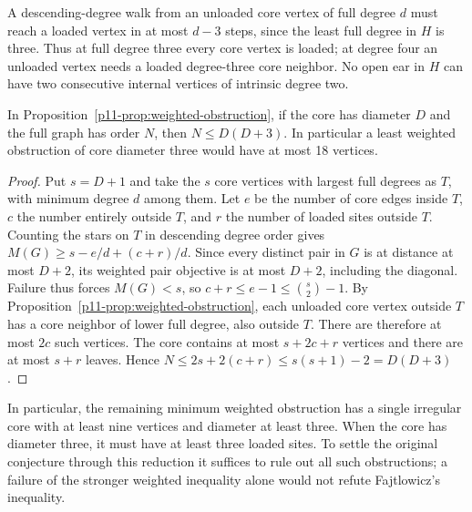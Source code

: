 \documentclass[11pt,a4paper]{article}
\begin{document}
A descending-degree walk from an unloaded core vertex of full degree
$d$ must reach a loaded vertex in at most $d-3$ steps, since the least
full degree in $H$ is three. Thus at full degree three every core
vertex is loaded; at degree four an unloaded vertex needs a loaded
degree-three core neighbor. No open ear in $H$ can have two consecutive
internal vertices of intrinsic degree two.

\begin{corollary}\label{p11-cor:weighted-order}
In Proposition~\ref{p11-prop:weighted-obstruction}, if the core has diameter
$D$ and the full graph has order $N$, then $N\le D(D+3)$.
In particular a least weighted obstruction of core diameter three
would have at most 18 vertices.
\end{corollary}
\begin{proof}
Put $s=D+1$ and take the $s$ core vertices with largest full degrees
as $T$, with minimum degree $d$ among them. Let $e$ be the number of
core edges inside $T$, $c$ the number entirely outside $T$, and $r$
the number of loaded sites outside $T$. Counting the stars on $T$ in
descending degree order gives $M(G)\ge s-e/d+(c+r)/d$.
Since every distinct pair in $G$ is at distance at most $D+2$, its
weighted pair objective is at most $D+2$, including the diagonal.
Failure thus forces $M(G)<s$, so $c+r\le e-1\le\binom{s}{2}-1$.
By Proposition~\ref{p11-prop:weighted-obstruction}, each unloaded core
vertex outside $T$ has a core neighbor of lower full degree, also
outside $T$. There are therefore at most $2c$ such vertices. The core
contains at most $s+2c+r$ vertices and there are at most $s+r$ leaves.
Hence $N\le 2s+2(c+r)\le s(s+1)-2=D(D+3)$.
\end{proof}


In particular, the remaining minimum weighted obstruction has a single irregular core with at least nine vertices and diameter at least three. When the core has diameter three, it must have at least three loaded sites. To settle the original conjecture through this reduction it suffices to rule out all such obstructions; a failure of the stronger weighted inequality alone would not refute Fajtlowicz's inequality.
\end{document}
